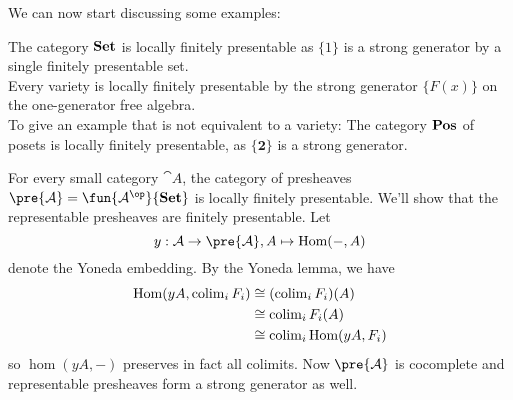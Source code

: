 We can now start discussing some examples:

\begin{Example} The category $\mathbf{Set}$ is locally finitely presentable as $\{1\}$ is a strong generator by a single finitely presentable set. \\

Every variety is locally finitely presentable by the strong generator $\{ F(x) \}$ on the one-generator free algebra. \\


To give an example that is not equivalent to a variety: The category $\mathbf{Pos}$ of posets is locally finitely presentable, as $\{\mathbf 2\}$ is a strong generator. %
\end{Example}

\begin{Example}
For every small category $\cat A$, the category of presheaves $\pre{\cat A} = \fun{\cat A^\op}{\catname{Set}}$ is locally finitely presentable. We'll show that the representable presheaves are finitely presentable. Let \[ y : \cat A \to \pre{\cat A}, A \mapsto \hom(-,A) \] denote the Yoneda embedding. By the Yoneda lemma, we have
\begin{align*}
\textrm{Hom}(yA, \operatorname{colim}_i F_i) &\cong (\operatorname{colim}_i F_i)(A) \\
&\cong \operatorname{colim}_i F_i(A) \\
&\cong \operatorname{colim}_i \textrm{Hom}(yA, F_i)
\end{align*}
so $\hom(yA,-)$ preserves in fact all colimits. Now $\pre{\cat A}$ is cocomplete and representable presheaves form a strong generator as well. %
\end{Example}

